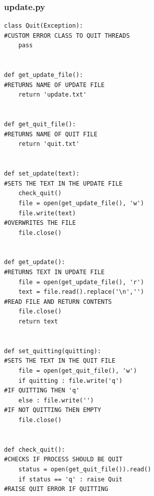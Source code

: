 \documentclass[titlepage]{article}
\begin{document}
\pagebreak
\subsubsection{update.py}
\begin{changemargin}{-1in}{-1in} 
\begin{verbatim}
class Quit(Exception):                                                          #CUSTOM ERROR CLASS TO QUIT THREADS
    pass


def get_update_file():                                                          #RETURNS NAME OF UPDATE FILE
    return 'update.txt'


def get_quit_file():                                                            #RETURNS NAME OF QUIT FILE
    return 'quit.txt'


def set_update(text):                                                           #SETS THE TEXT IN THE UPDATE FILE
    check_quit()
    file = open(get_update_file(), 'w')
    file.write(text)                                                            #OVERWRITES THE FILE
    file.close()


def get_update():                                                               #RETURNS TEXT IN UPDATE FILE
    file = open(get_update_file(), 'r')
    text = file.read().replace('\n','')                                         #READ FILE AND RETURN CONTENTS
    file.close()
    return text
 

def set_quitting(quitting):                                                     #SETS THE TEXT IN THE QUIT FILE
    file = open(get_quit_file(), 'w')
    if quitting : file.write('q')                                               #IF QUITTING THEN 'q'
    else : file.write('')                                                       #IF NOT QUITTING THEN EMPTY
    file.close()


def check_quit():                                                               #CHECKS IF PROCESS SHOULD BE QUIT
    status = open(get_quit_file()).read()
    if status == 'q' : raise Quit                                               #RAISE QUIT ERROR IF QUITTING
\end{verbatim}
\end{changemargin} 

\pagebreak
\end{document}
